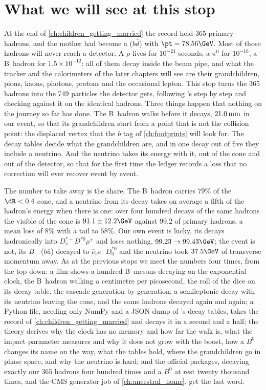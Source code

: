 \section{What we will see at this stop}
\label{sec:children_producing_grandchildren:what_we_compute}

At the end of \cref{ch:children_getting_married} the record held 365 primary
hadrons, and the mother had become a \Bstarbar ($b\bar d$) with
$\pt=78.56\GeV$. Most of those hadrons will never reach a detector. A $\rho$
lives for $10^{-24}$ seconds, a $\pi^0$ for $10^{-16}$, a B~hadron for
$1.5\times10^{-12}$: all of them decay inside the beam pipe, and what the
tracker and the calorimeters of the later chapters will see are their
grandchildren, pions, kaons, photons, protons and the occasional lepton. This
stop turns the 365 hadrons into the 749 particles the detector gets,
following \PYTHIA's  step by step and checking against it
on the identical hadrons. Three things happen that nothing on the journey so
far has done. The B~hadron walks before it decays, $21.0\,\mathrm{mm}$ in our event, so
that its grandchildren start from a point that is not the collision point:
the displaced vertex that the $b$ tag of \cref{ch:footprints} will look for.
The decay tables decide what the grandchildren are, and in one decay out of
five they include a neutrino. And the neutrino takes its energy with it, out
of the cone and out of the detector, so that for the first time the ledger
records a loss that no correction will ever recover event by event.

The number to take away is the share. The B~hadron carries $79\%$ of the
$\dR<0.4$ cone, and a neutrino from its decay takes on average a fifth of
the hadron's energy when there is one: over four hundred decays of the same
hadrons the visible \pt of the cone is $91.1\pm12.2\GeV$ against $99.2$ of
primary hadrons, a mean loss of $8\%$ with a tail to $58\%$. Our own event
is lucky, its \Bbar decays hadronically into $D_s^{*-}D^{*0}\rho^+$ and
loses nothing, $99.23\to99.43\GeV$; the \CMSSW event is not, its $B^-$
($b\bar u$) decayed to $\bar\nu_e e^-D_0^{*0}$ and the neutrino took
$37.5\GeV$ of transverse momentum away. As at the previous stops we meet
the numbers four times, from the top down: a film shows a hundred B~mesons
decaying on the exponential clock, the B~hadron walking a centimetre per
picosecond, the roll of the dice on its decay table, the cascade generation
by generation, a semileptonic decay with its neutrino leaving the cone, and
the same hadrons decayed again and again; a Python file, needing only NumPy
and a JSON dump of \PYTHIA's decay tables, takes the record of
\cref{ch:children_getting_married} and decays it in a second and a half;
the theory derives why the clock has no memory and how far the walk is,
what the impact parameter measures and why it does not grow with the boost,
how a $B^0$ changes its name on the way, what the tables hold, where the
grandchildren go in phase space, and why the neutrino is hard; and the
official packages, \PYTHIA decaying exactly our $365$ hadrons four hundred
times and a $B^0$ at rest twenty thousand times, and the CMS generator job
of \cref{ch:ancestral_home}, get the last word.

